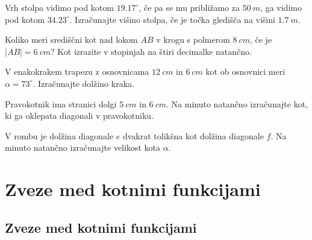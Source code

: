             \begin{naloga}
                Vrh stolpa vidimo pod kotom $19.17^\circ$, če pa se mu približamo za $50~m$, ga vidimo pod kotom $34.23^\circ$.
                Izračunajte višino stolpa, če je točka gledišča na višini $1.7~m$.
            \end{naloga}

        


        
            \begin{naloga}
                Koliko meri središčni kot nad lokom $AB$ v krogu s polmerom $8~cm$, če je $\lvert AB \rvert=6~cm$?
                Kot izrazite v stopinjah na štiri decimalke natančno.
            \end{naloga}


            \begin{naloga}
                V enakokrakem trapezu z osnovnicama $12~cm$ in $6~cm$  kot ob osnovnici meri $\alpha=73^\circ$.
                Izračunajte dolžino kraka.
            \end{naloga}


            \begin{naloga}
                Pravokotnik ima stranici dolgi $5~cm$ in $6~cm$. Na minuto natančno izračunajte kot,
                ki ga oklepata diagonali v pravokotniku.
            \end{naloga}

            \begin{naloga}
                V rombu je dolžina diagonale $e$ dvakrat tolikšna kot dolžina diagonale $f$.
                Na minuto natančno izračunajte velikost kota $\alpha$.
            \end{naloga}

        





    \section{Zveze med kotnimi funkcijami}

        
            \subsection{Zveze med kotnimi funkcijami}
                           
            
                    
